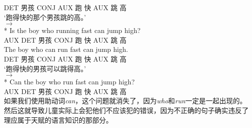 DET 男孩 CONJ AUX 跑 快 AUX 跳 高\\
\glt `跑得快的那个男孩跳的高。'\\
$\to$\\
 {}* \gll Is the boy who running fast can jump high?\\
AUX DET 男孩 CONJ 跑 快 AUX 跳 高\\
\ex 
\gll {} The boy who can run fast can jump high. \\
DET 男孩 CONJ AUX 跑 快 AUX 跳 高\\
\glt `跑得快的男孩可以跳得高。'\\
$\to$\\
 {}* \gll Can the boy who run fast can jump high?\\
AUX DET 男孩 CONJ 跑 快 AUX 跳 高\\
\zl
如果我们使用助动词\emph{can}，这个问题就消失了，因为\emph{who}和\emph{run}一定是一起出现的。然后这就导致儿童实际上会犯他们不应该犯的错误，因为不正确的句子确实违反了理应属于天赋的语言知识的那部分。

